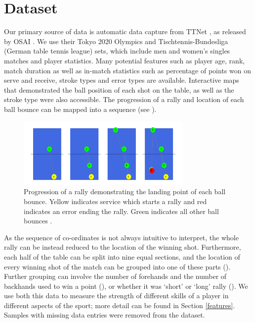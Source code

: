 \section{Dataset} \label{sec:dataset}
Our primary source of data is automatic data capture from TTNet \cite{voeikov2020ttnet}, as released by OSAI \cite{OSAI}. We use their Tokyo 2020 Olympics and Tischtennis-Bundesliga (German table tennis league) sets, which include men and women's singles matches and player statistics. Many potential features such as player age, rank, match duration as well as in-match statistics such as percentage of points won on serve and receive, stroke types and error types are available. Interactive maps that demonstrated the ball position of each shot on the table, as well as the stroke type were also accessible. The progression of a rally and location of each ball bounce can be mapped into a sequence (see ).


\begin{figure}[t]
\centering

\includegraphics[width=8.5cm]{plots/tablesequence.pdf}
\caption{Progression of a rally demonstrating the landing point of each ball bounce. Yellow indicates service which starts a rally and red indicates an error ending the rally. Green indicates all other ball bounces \cite{OSAI}.}

\label{fig:sequence}
\end{figure}

As the sequence of co-ordinates is not always intuitive to interpret, the whole rally can be instead reduced to the location of the winning shot. Furthermore, each half of the table can be split into nine equal sections, and the location of every winning shot of the match can be grouped into one of these parts (). Further grouping can involve the number of forehands and the number of backhands used to win a point (), or whether it was `short' or `long' rally (). We use both this data to measure the strength of different skills of a player in different aspects of the sport; more detail can be found in Section \ref{features}.
Samples with missing data entries were removed from the dataset.

